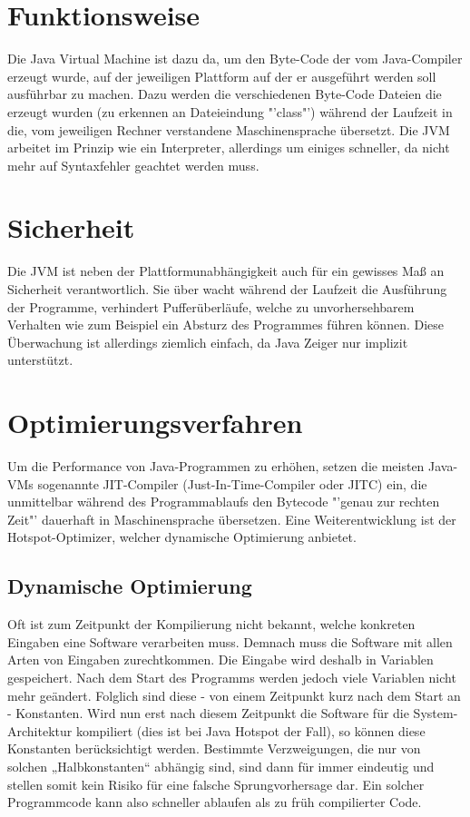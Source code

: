 \documentclass[a4paper,14pt]{scrreprt}
\begin{document}
\section{Funktionsweise}
Die Java Virtual Machine ist dazu da, um den Byte-Code der vom Java-Compiler erzeugt wurde, auf der jeweiligen Plattform auf der er ausgeführt werden soll ausführbar zu machen. Dazu werden die verschiedenen Byte-Code Dateien die erzeugt wurden (zu erkennen an Dateieindung "'class"') während der Laufzeit in die, vom jeweiligen Rechner verstandene Maschinensprache übersetzt. Die JVM arbeitet im Prinzip wie ein Interpreter, allerdings um einiges schneller, da nicht mehr auf Syntaxfehler geachtet werden muss. 
\section{Sicherheit}
Die JVM ist neben der Plattformunabhängigkeit auch für ein gewisses Maß an Sicherheit verantwortlich. Sie über wacht während der Laufzeit die Ausführung der Programme, verhindert Pufferüberläufe, welche zu unvorhersehbarem Verhalten wie zum Beispiel ein Absturz des Programmes führen können. Diese Überwachung ist allerdings ziemlich einfach, da Java Zeiger nur implizit unterstützt.
\section{Optimierungsverfahren}
Um die Performance von Java-Programmen zu erhöhen, setzen die meisten Java-VMs sogenannte JIT-Compiler (Just-In-Time-Compiler oder JITC) ein, die unmittelbar während des Programmablaufs den Bytecode "'genau zur rechten Zeit"' dauerhaft in Maschinensprache übersetzen. Eine Weiterentwicklung ist der Hotspot-Optimizer, welcher dynamische Optimierung anbietet.
\subsection{Dynamische Optimierung}
Oft ist zum Zeitpunkt der Kompilierung nicht bekannt, welche konkreten Eingaben eine Software verarbeiten muss. Demnach muss die Software mit allen Arten von Eingaben zurechtkommen. Die Eingabe wird deshalb in Variablen gespeichert. Nach dem Start des Programms werden jedoch viele Variablen nicht mehr geändert. Folglich sind diese - von einem Zeitpunkt kurz nach dem Start an - Konstanten. Wird nun erst nach diesem Zeitpunkt die Software für die System-Architektur kompiliert (dies ist bei Java Hotspot der Fall), so können diese Konstanten berücksichtigt werden. Bestimmte Verzweigungen, die nur von solchen „Halbkonstanten“ abhängig sind, sind dann für immer eindeutig und stellen somit kein Risiko für eine falsche Sprungvorhersage dar. Ein solcher Programmcode kann also schneller ablaufen als zu früh compilierter Code.
\end{document}
